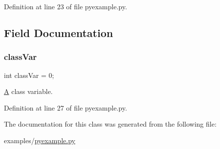 Definition at line 23 of file pyexample.\+py.



\subsection{Field Documentation}
\mbox{\label{classpyexample_1_1_py_class_af4cea5ee982f0598f7393af0cd670fc5}} 
\subsubsection{\texorpdfstring{class\+Var}{classVar}}
{\footnotesize\ttfamily int class\+Var = 0;\hspace{0.3cm}{\ttfamily [static]}}



\hyperlink{class_a}{A} class variable. 



Definition at line 27 of file pyexample.\+py.



The documentation for this class was generated from the following file\+:\begin{DoxyCompactItemize}
\item 
examples/\hyperlink{pyexample_8py}{pyexample.\+py}\end{DoxyCompactItemize}
